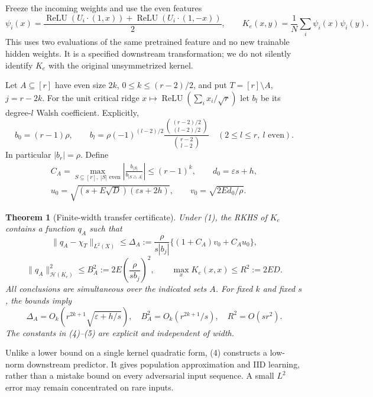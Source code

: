 \documentclass[11pt]{article}
\newtheorem{theorem}{Theorem}\newtheorem{lemma}[theorem]{Lemma}
\newcommand{\relu}{\operatorname{ReLU}}
\begin{document}
Freeze the incoming weights and use the even features
\[
 \psi_i(x)=\frac{\relu(U_i\cdot(1,x))+
                         \relu(U_i\cdot(1,-x))}{2},\qquad
 K_e(x,y)=\frac1N\sum_i\psi_i(x)\psi_i(y).
 \tag{2}
\]
This uses two evaluations of the same pretrained feature and no new
trainable hidden weights. It is a specified downstream transformation;
we do not silently identify $K_e$ with the original unsymmetrized kernel.

Let $A\subseteq[r]$ have even size $2k$, $0\le k\le(r-2)/2$, and put
$T=[r]\setminus A$, $j=r-2k$. For the unit critical ridge
$x\mapsto\relu(\sum_i x_i/\sqrt r)$ let $b_l$ be its degree-$l$
Walsh coefficient. Explicitly,
\[
 b_0=(r-1)\rho,\qquad
 b_l=\rho(-1)^{(l-2)/2}
 \frac{\binom{(r-2)/2}{(l-2)/2}}{\binom{r-2}{l-2}}
 \quad(2\le l\le r,\ l\text{ even}).                 \tag{3}
\]
In particular $|b_r|=\rho$. Define
\begin{gather*}
 C_A=\max_{S\subseteq[r],\ |S|\text{ even}}
              \left|\frac{b_{|S|}}{b_{|S\mathbin\triangle A|}}\right|
       \le(r-1)^k,\qquad d_0=\varepsilon s+h,\\
 u_0=\sqrt{(s+E\sqrt D)(\varepsilon s+2h)},\qquad
 v_0=\sqrt{2Ed_0/\rho}.
\end{gather*}

\begin{theorem}[Finite-width transfer certificate]\label{thm:transfer}
Under (1), the RKHS of $K_e$ contains a function $q_A$ such that
\[
 \|q_A-\chi_T\|_{L^2(X)}
 \le\Delta_A:=\frac{\rho}{s|b_j|}
                    \{(1+C_A)v_0+C_Au_0\},             \tag{4}
\]
\[
 \|q_A\|_{\mathcal H(K_e)}^2
       \le B_A^2:=2E\left(\frac{\rho}{s b_j}\right)^2,
 \qquad \max_x K_e(x,x)\le R^2:=2ED.                  \tag{5}
\]
All conclusions are simultaneous over the indicated sets $A$.
For fixed $k$ and fixed $s$, the bounds imply
\[
 \Delta_A=O_k\left(r^{2k+1}\sqrt{\varepsilon+h/s}\right),
 \quad B_A^2=O_k(r^{2k+1}/s),\quad R^2=O(sr^2).
 \tag{6}
\]
The constants in (4)--(5) are explicit and independent of width.
\end{theorem}

Unlike a lower bound on a single kernel quadratic form, (4) constructs
a low-norm downstream predictor. It gives population approximation and
IID learning, rather than a mistake bound on every adversarial input
sequence. A small $L^2$ error may remain concentrated on rare inputs.
\end{document}
